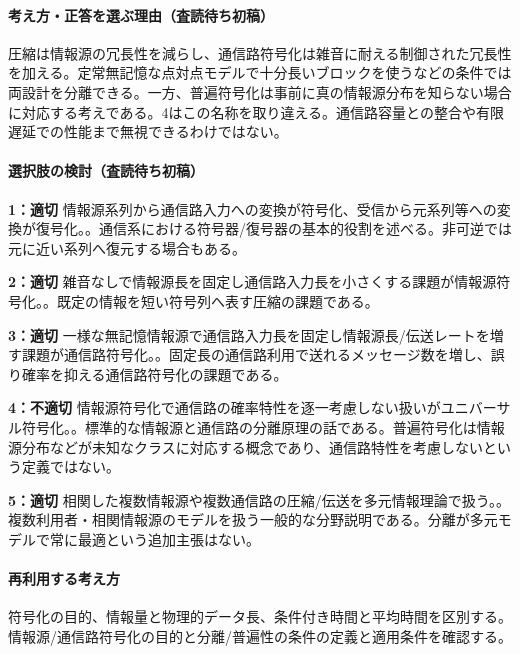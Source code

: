 \paragraph{考え方・正答を選ぶ理由（査読待ち初稿）} 圧縮は情報源の冗長性を減らし、通信路符号化は雑音に耐える制御された冗長性を加える。定常無記憶な点対点モデルで十分長いブロックを使うなどの条件では両設計を分離できる。一方、普遍符号化は事前に真の情報源分布を知らない場合に対応する考えである。4はこの名称を取り違える。通信路容量との整合や有限遅延での性能まで無視できるわけではない。

\paragraph{選択肢の検討（査読待ち初稿）}\mbox{}\par

\noindent\textbf{1：適切} 情報源系列から通信路入力への変換が符号化、受信から元系列等への変換が復号化。。通信系における符号器/復号器の基本的役割を述べる。非可逆では元に近い系列へ復元する場合もある。\par

\noindent\textbf{2：適切} 雑音なしで情報源長を固定し通信路入力長を小さくする課題が情報源符号化。。既定の情報を短い符号列へ表す圧縮の課題である。\par

\noindent\textbf{3：適切} 一様な無記憶情報源で通信路入力長を固定し情報源長/伝送レートを増す課題が通信路符号化。。固定長の通信路利用で送れるメッセージ数を増し、誤り確率を抑える通信路符号化の課題である。\par

\noindent\textbf{4：不適切} 情報源符号化で通信路の確率特性を逐一考慮しない扱いがユニバーサル符号化。。標準的な情報源と通信路の分離原理の話である。普遍符号化は情報源分布などが未知なクラスに対応する概念であり、通信路特性を考慮しないという定義ではない。\par

\noindent\textbf{5：適切} 相関した複数情報源や複数通信路の圧縮/伝送を多元情報理論で扱う。。複数利用者・相関情報源のモデルを扱う一般的な分野説明である。分離が多元モデルで常に最適という追加主張はない。\par

\paragraph{再利用する考え方} 符号化の目的、情報量と物理的データ長、条件付き時間と平均時間を区別する。情報源/通信路符号化の目的と分離/普遍性の条件の定義と適用条件を確認する。

